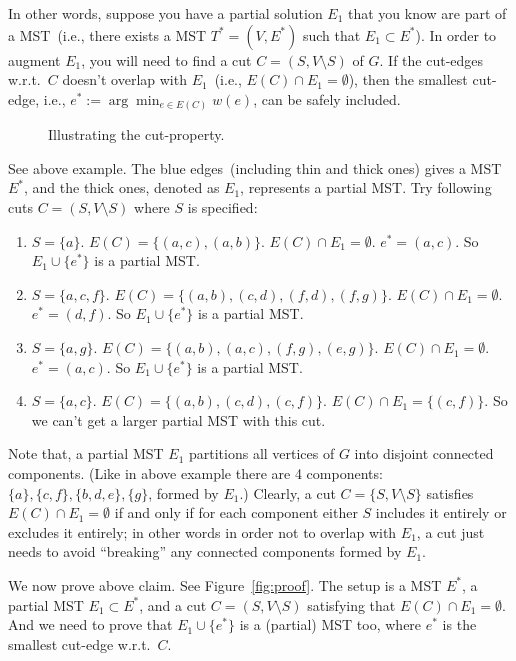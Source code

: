 In other words, suppose you have a partial solution $E_1$ that you know
are part of a MST~(i.e., there exists a MST $T^* = (V, E^*)$ such that $E_1\subset E^*$). 
In order to augment $E_1$, you will need to find a cut $C = (S, V\setminus S)$ of $G$.
If the cut-edges w.r.t.\ $C$ doesn't overlap with $E_1$~(i.e., $E(C)\cap E_1 = \emptyset$),
then the smallest cut-edge, i.e., $e^* := \arg\min_{e\in E(C)} w(e)$,
can be safely included.

\begin{figure}[h]
\centering{}
\caption{Illustrating the cut-property.}
\label{fig:spanning}
\end{figure}

See above example. The blue edges~(including thin and thick ones)
gives a MST $E^*$, and the thick ones, denoted as $E_1$, represents a partial MST.
Try following cuts $C = (S, V\setminus S)$ where $S$ is specified:
\begin{enumerate}
\item $S = \{a\}$. $E(C) = \{(a,c), (a,b)\}$. $E(C) \cap E_1 = \emptyset$. $e^* = (a,c)$.
So $E_1\cup\{e^*\}$ is a partial MST.
\item $S = \{a,c,f\}$. $E(C) = \{(a,b), (c,d), (f,d), (f,g)\}$. $E(C) \cap E_1 = \emptyset$. $e^* = (d,f)$.
So $E_1\cup\{e^*\}$ is a partial MST.
\item $S = \{a,g\}$. $E(C) = \{(a,b), (a,c), (f,g), (e,g)\}$. $E(C) \cap E_1 = \emptyset$. $e^* = (a,c)$.
So $E_1\cup\{e^*\}$ is a partial MST.
\item $S = \{a,c\}$. $E(C) = \{(a,b), (c,d), (c,f)\}$. $E(C) \cap E_1 = \{(c,f)\}$. So we can't get a larger partial MST with this cut.
\end{enumerate}

Note that, a partial MST $E_1$ partitions all vertices of $G$ into disjoint connected components.
(Like in above example there are 4 components: $\{a\}, \{c,f\}, \{b,d,e\}, \{g\}$, formed by $E_1$.)
Clearly, a cut $C=\{S,V\setminus S\}$ satisfies $E(C) \cap E_1 = \emptyset$ if and only if for each component
either $S$ includes it entirely or excludes it entirely;
in other words in order not to overlap with $E_1$, a cut just needs to avoid ``breaking''
any connected components formed by $E_1$.

We now prove above claim.  See Figure~\ref{fig:proof}.
The setup is a MST $E^*$, a partial MST $E_1\subset E^*$,
and a cut $C = (S,V\setminus S)$ satisfying that $E(C)\cap E_1 = \emptyset$.
And we need to prove that $E_1\cup \{e^*\}$ is a (partial) MST too,
where $e^*$ is the smallest cut-edge w.r.t.\ $C$.


